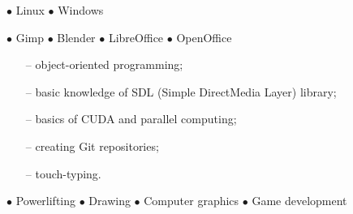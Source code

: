 \documentclass[11pt,a4paper]{article}
\begin{document}
  \bigskip
  \noindent
  \begin{minipage}[t]{0.35\textwidth}
  
    
    
    \medskip
    \centerline{
      \hfill
      $\bullet$ Linux
      \hfill
      $\bullet$ Windows
      \hfill
    }
  \end{minipage}
  \begin{minipage}[t]{0.65\textwidth}
  
    
    
    \medskip
    \centerline{
      \hfill
      $\bullet$ Gimp
      \hfill
      $\bullet$ Blender
      \hfill
      $\bullet$ LibreOffice
      \hfill
      $\bullet$ OpenOffice
      \hfill
    }
  \end{minipage}
  
  
  \bigskip
  \vspace{-1mm}
  \begin{itemize} \itemsep2pt \parskip0pt 
    \item[--] object-oriented programming;
    \item[--] basic knowledge of SDL (Simple DirectMedia Layer) library;
    \item[--] basics of CUDA and parallel computing;
    \item[--] creating Git repositories;
    \item[--] touch-typing.
  \end{itemize}
  
  
  \smallskip
  
  \medskip
  \centerline{
    \hfill
    $\bullet$ Powerlifting
    \hfill
    $\bullet$ Drawing
    \hfill
    $\bullet$ Computer graphics
    \hfill
    $\bullet$ Game development
    \hfill
  }
  
  
\end{document}
